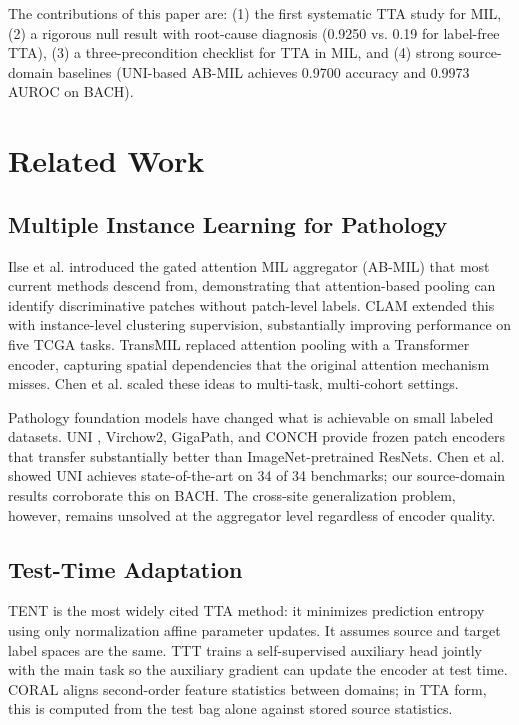 \documentclass[conference]{IEEEtran}
\begin{document}
The contributions of this paper are: (1) the first systematic TTA study for MIL, (2) a rigorous null result with root-cause diagnosis (0.9250 vs. 0.19 for label-free TTA), (3) a three-precondition checklist for TTA in MIL, and (4) strong source-domain baselines (UNI-based AB-MIL achieves 0.9700 accuracy and 0.9973 AUROC on BACH).



\section{Related Work}
\label{sec:related}

\subsection{Multiple Instance Learning for Pathology}

Ilse et al. \cite{ilse2018attention} introduced the gated attention MIL aggregator (AB-MIL) that most current methods descend from, demonstrating that attention-based pooling can identify discriminative patches without patch-level labels. CLAM \cite{lu2021data} extended this with instance-level clustering supervision, substantially improving performance on five TCGA tasks. TransMIL \cite{shao2021transmil} replaced attention pooling with a Transformer encoder, capturing spatial dependencies that the original attention mechanism misses. Chen et al. \cite{chen2022scaling} scaled these ideas to multi-task, multi-cohort settings.

Pathology foundation models have changed what is achievable on small labeled datasets. UNI \cite{chen2024uni}, Virchow2, GigaPath, and CONCH provide frozen patch encoders that transfer substantially better than ImageNet-pretrained ResNets. Chen et al. \cite{chen2024uni} showed UNI achieves state-of-the-art on 34 of 34 benchmarks; our source-domain results corroborate this on BACH. The cross-site generalization problem, however, remains unsolved at the aggregator level regardless of encoder quality.

\subsection{Test-Time Adaptation}

TENT \cite{wang2021tent} is the most widely cited TTA method: it minimizes prediction entropy using only normalization affine parameter updates. It assumes source and target label spaces are the same. TTT \cite{sun2020test} trains a self-supervised auxiliary head jointly with the main task so the auxiliary gradient can update the encoder at test time. CORAL \cite{sun2016coral} aligns second-order feature statistics between domains; in TTA form, this is computed from the test bag alone against stored source statistics.
\end{document}
